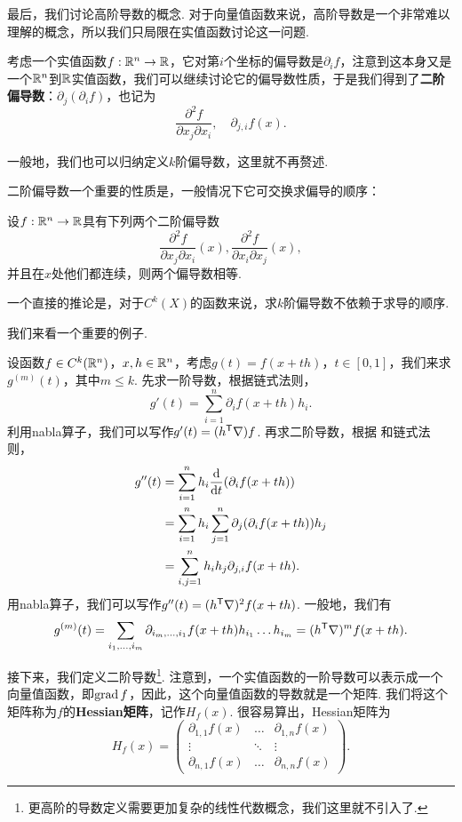 最后，我们讨论高阶导数的概念. 对于向量值函数来说，高阶导数是一个非常难以理解的概念，所以我们只局限在实值函数讨论这一问题. 

考虑一个实值函数$f:\mathbb{R}^n\to\mathbb{R}$，它对第$i$个坐标的偏导数是$\partial_i f$，注意到这本身又是一个$\mathbb{R}^n$到$\mathbb{R}$实值函数，我们可以继续讨论它的偏导数性质，于是我们得到了\textbf{二阶偏导数}：$\partial_j(\partial_i f)$，也记为
\[\frac{\partial^2 f}{\partial x_j\partial x_i},\quad\partial_{j,i} f(x).\]

一般地，我们也可以归纳定义$k$阶偏导数，这里就不再赘述. 

二阶偏导数一个重要的性质是，一般情况下它可交换求偏导的顺序：

\begin{proposition}\label{proposition:partial-commute}
    设$f:\mathbb{R}^n\to\mathbb{R}$具有下列两个二阶偏导数
    \[\frac{\partial^2 f}{\partial x_j\partial x_i}(x),\frac{\partial^2 f}{\partial x_i\partial x_j}(x),\]
    并且在$x$处他们都连续，则两个偏导数相等.
\end{proposition}

一个直接的推论是，对于$C^k(X)$的函数来说，求$k$阶偏导数不依赖于求导的顺序. 

我们来看一个重要的例子. 
\begin{example}\label{example:multi-taylor}
设函数$f\in C^k(\mathbb{R}^n)$，$x,h\in\mathbb{R}^n$，考虑$g(t)=f(x+th)$，$t\in[0,1]$，我们来求$g^{(m)}(t)$，其中$m\leq k$. 先求一阶导数，根据链式法则，
\[g'(t)=\sum_{i=1}^n\partial_i f(x+th)h_i.\]
利用nabla算子，我们可以写作$g'(t)=(h^{\mathsf{T}}\nabla) f$.
再求二阶导数，根据 和链式法则，
\begin{align*}
    g''(t)&=\sum_{i=1}^nh_i\frac{\mathrm{d}}{\mathrm{d} t}(\partial_i f(x+th))\\
    &=\sum_{i=1}^nh_i\sum_{j=1}^n\partial_j(\partial_i f(x+th))h_j\\
    &=\sum_{i,j=1}^nh_ih_j\partial_{j,i}f(x+th).
\end{align*}
用nabla算子，我们可以写作$g''(t)=(h^{\mathsf{T}}\nabla)^2f(x+th)$. 一般地，我们有
\[g^{(m)}(t)=\sum_{i_1,\dots,i_m}\partial_{i_m,\dots,i_1}f(x+th)h_{i_1}\dots h_{i_m}=(h^{\mathsf{T}}\nabla)^mf(x+th).\]
\end{example}

接下来，我们定义二阶导数\footnote{更高阶的导数定义需要更加复杂的线性代数概念，我们这里就不引入了. }. 注意到，一个实值函数的一阶导数可以表示成一个向量值函数，即$\operatorname*{grad} f$，因此，这个向量值函数的导数就是一个矩阵. 我们将这个矩阵称为$f$的\textbf{Hessian矩阵}，记作$H_f(x)$. 很容易算出，Hessian矩阵为
\[H_f(x)=\begin{pmatrix}
    \partial_{1,1}f(x) & \dots & \partial_{1,n}f(x) \\
    \vdots & \ddots & \vdots \\
    \partial_{n,1}f(x) & \dots & \partial_{n,n}f(x)
\end{pmatrix}.\]

